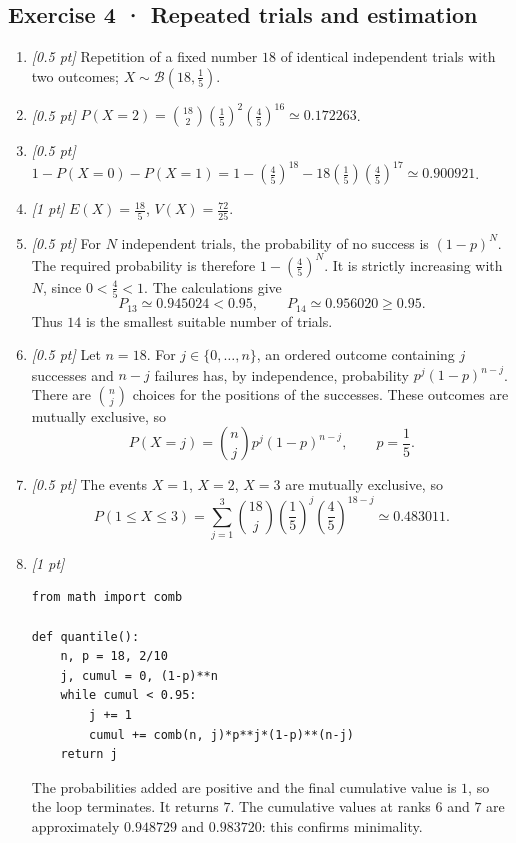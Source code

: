 \subsection*{Exercise 4 · Repeated trials and estimation}\begin{enumerate}

\item \textit{[0.5 pt]} Repetition of a fixed number $18$ of identical independent trials with two outcomes; $X\sim\mathcal B(18,\frac{1}{5})$.

\item \textit{[0.5 pt]} $P(X=2)=\binom{18}2(\frac{1}{5})^2(\frac{4}{5})^{16}\simeq0.172263$.

\item \textit{[0.5 pt]} $1-P(X=0)-P(X=1)=1-(\frac{4}{5})^{18}-18(\frac{1}{5})(\frac{4}{5})^{17}\simeq0.900921$.

\item \textit{[1 pt]} $E(X)=\frac{18}{5}$, $V(X)=\frac{72}{25}$.

\item \textit{[0.5 pt]} For $N$ independent trials, the probability of no success is $(1-p)^N$. The required probability is therefore $1-(\frac{4}{5})^N$. It is strictly increasing with $N$, since $0<\frac{4}{5}<1$. The calculations give
\[P_{13}\simeq0.945024<0.95,\qquad P_{14}\simeq0.956020\ge0.95.\]
Thus $14$ is the smallest suitable number of trials.

\item \textit{[0.5 pt]} Let $n=18$. For $j\in\{0,\ldots,n\}$, an ordered outcome containing $j$ successes and $n-j$ failures has, by independence, probability $p^j(1-p)^{n-j}$. There are $\binom nj$ choices for the positions of the successes. These outcomes are mutually exclusive, so
\[P(X=j)=\binom nj p^j(1-p)^{n-j},\qquad p=\frac{1}{5}.\]

\item \textit{[0.5 pt]} The events $X=1$, $X=2$, $X=3$ are mutually exclusive, so
\[P(1\le X\le3)=\sum_{j=1}^3\binom{18}j(\frac{1}{5})^j(\frac{4}{5})^{18-j}\simeq0.483011.\]


\item \textit{[1 pt]} 
\begin{lstlisting}
from math import comb

def quantile():
    n, p = 18, 2/10
    j, cumul = 0, (1-p)**n
    while cumul < 0.95:
        j += 1
        cumul += comb(n, j)*p**j*(1-p)**(n-j)
    return j
\end{lstlisting}
The probabilities added are positive and the final cumulative value is $1$, so the loop terminates. It returns $7$. The cumulative values at ranks $6$ and $7$ are approximately $0.948729$ and $0.983720$: this confirms minimality.

\end{enumerate}

